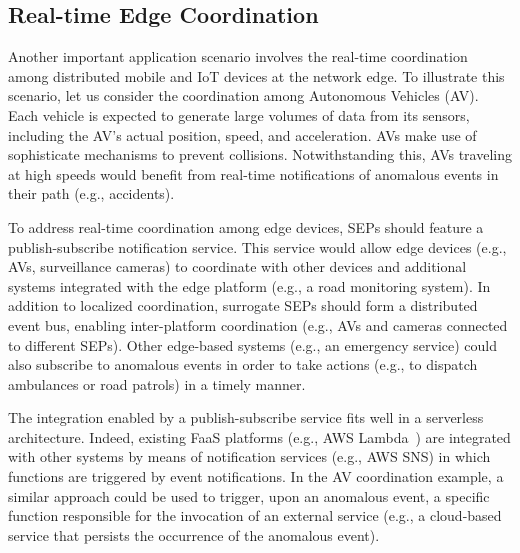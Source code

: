 \documentclass[letterpaper, 10 pt, conference]{ieeeconf}  %
\begin{document}
\subsection{Real-time Edge Coordination}

Another important application scenario involves the real-time coordination among distributed mobile and IoT devices at the network edge. To illustrate this scenario, let us consider the coordination among Autonomous Vehicles (AV). Each vehicle is expected to generate large volumes of data from its sensors, including the AV's actual position, speed, and acceleration. AVs make use of sophisticate mechanisms to prevent collisions. Notwithstanding this, AVs traveling at high speeds would benefit from real-time notifications of anomalous events in their path (e.g., accidents). 

To address real-time coordination among edge devices, SEPs should feature a publish-subscribe notification service. This service would allow edge devices (e.g., AVs, surveillance cameras) to coordinate with other devices and additional systems integrated with the edge platform (e.g., a road monitoring system). In addition to localized coordination, surrogate SEPs should form a distributed event bus, enabling inter-platform coordination (e.g., AVs and cameras connected to different SEPs). Other edge-based systems (e.g., an emergency service) could also subscribe to anomalous events in order to take actions (e.g., to dispatch ambulances or road patrols) in a timely manner.

The integration enabled by a publish-subscribe service fits well in a serverless architecture. Indeed, existing FaaS platforms (e.g., AWS Lambda~\cite{}) are integrated with other systems by means of notification services (e.g., AWS SNS) in which functions are triggered by event notifications. In the AV coordination example, a similar approach could be used to trigger, upon an anomalous event, a specific function responsible for the invocation of an external service (e.g., a cloud-based service that persists the occurrence of the anomalous event). 
\end{document}
